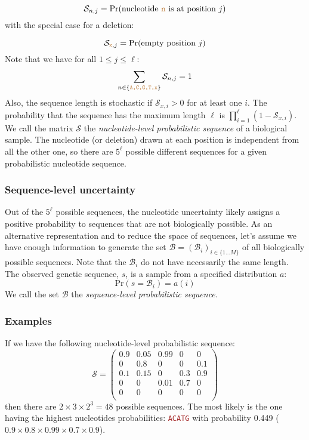 \documentclass[10pt]{article}
\newcommand{\sq}[1]{\texttt{\textcolor{brown}{#1}}}
\newcommand{\pr}[1]{\mathrm{Pr}(#1)}
\newcommand{\sps}{\mathcal{B}} %
\newcommand{\nps}{\mathcal{S}} %
\newcommand{\nlps}{nucleotide-level probabilistic sequence\xspace}
\newcommand{\slps}{sequence-level probabilistic sequence\xspace}
\begin{document}
\begin{equation}
\nps_{n,j} = \pr{\text{nucleotide \sq{n} is at position }j}
\end{equation}
with the special case for a deletion:

\begin{equation}
\nps_{\sq{x},j} = \pr{\text{empty position }j}
\end{equation}
Note that we have for all $1\leq j \leq \ell$:
\begin{equation}
\sum_{n\in \{ \sq{A,C,G,T,x} \} } \nps_{n, j} = 1
\end{equation}
Also, the sequence length is stochastic if $\nps_{x,i}>0$ for at least one $i$. The probability that the sequence has the maximum length $\ell$ is $\prod_{i=1}^\ell (1-\nps_{x,i})$. 
We call the matrix $\nps$ the \emph{\nlps} of a biological sample.
The nucleotide (or deletion) drawn at each position is independent from all the other one, so there are $5^\ell$ possible different sequences for a given probabilistic nucleotide sequence. 



\subsubsection{Sequence-level uncertainty}

Out of the $5^\ell$ possible sequences, the nucleotide uncertainty likely assigns a positive probability to sequences that are not biologically possible.
As an alternative representation and to reduce the space of sequences, let's assume we have enough information to generate the set $\sps = (\sps_i)_{i\in\{1\ldots M\} }$ of all biologically possible sequences. Note that the $\sps_i$ do not have necessarily the same length. 
The observed genetic sequence, $s$, is a sample from a specified distribution $a$:
\begin{equation}
\pr{s = \sps_i} = a(i)
\end{equation}
We call the set $\sps$ the \emph{\slps}.




\subsubsection{Examples}

If we have the following \nlps:
$$
\nps = 
\begin{pmatrix}
0.9 & 0.05   & 0.99 & 0 & 0\\
0   & 0.8 & 0 & 0 & 0.1\\
0.1 & 0.15 & 0 & 0.3 & 0.9\\
0 & 0 & 0.01 & 0.7 & 0\\
0 & 0 & 0 & 0 & 0\\
\end{pmatrix}
$$
then there are $2\times 3 \times 2^3 = 48$ possible sequences. The most likely is the one having the highest nucleotides probabilities: \sq{ACATG} with probability 0.449  ($0.9\times 0.8\times 0.99 \times 0.7 \times 0.9$).
\end{document}
